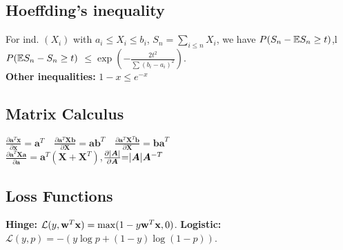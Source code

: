 
\subsection*{Hoeffding's inequality}
For ind. $(X_i)$ with $a_i\leq X_i\leq b_i$, $S_n=\sum_{i\leq n}X_i$, we have $P(S_n-\mathbb{E} S_n\geq t)$,l $P(\mathbb{E} S_n - S_n \geq t)$ $\leq \exp(-\frac{2t^2}{\sum(b_i-a_i)^2})$.\\

\textbf{Other inequalities:} $1-x \leq e^{-x}$\quad

\subsection*{Matrix Calculus}
$\frac{\partial \mathbf{a}^T\mathbf{x}}{\partial\mathbf{x}}{=}\mathbf{a}^T \quad \frac{\partial \mathbf{a}^T\mathbf{Xb}}{\partial\mathbf{X}}{=}\mathbf{ab}^T \quad \frac{\partial \mathbf{a}^T\mathbf{X}^T\mathbf{b}}{\partial\mathbf{X}}{=}\mathbf{ba}^T $\\
$\frac{\partial \mathbf{a}^T\mathbf{Xa}}{\partial\mathbf{a}}{=}\mathbf{a}^T(\mathbf{X}+\mathbf{X}^T)$,$\frac{\partial |{\bm{A}}|}{\partial {\bm{A}}}{=}|{\bm{A}}|{\bm{A}}^{-T}$\\

\subsection*{Loss Functions}
\textbf{Hinge:} $\mathcal{L}(y,{\mathbf{w}}^T{\mathbf{x}}) = \max(1-y{\mathbf{w}}^T{\mathbf{x}}, 0)$.
\textbf{Logistic:} $\mathcal{L}(y,p) = -(y\log p + (1-y)\log (1-p))$.


